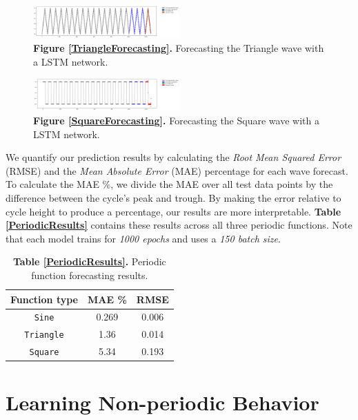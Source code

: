 \documentclass[letterpaper, 10 pt, conference]{ieeeconf}  %
\begin{document}
\label{TriangleForecasting}
\begin{figure}[h]
	\centering
	\includegraphics[width=0.5\textwidth]{assets/triangle_forecast.png}
    \caption{\textbf{Figure \ref{TriangleForecasting}.} Forecasting the Triangle wave with a LSTM network.}
\end{figure}

\label{SquareForecasting}
\begin{figure}[h]
	\centering
	\includegraphics[width=0.5\textwidth]{assets/square_forecast_500epoch.png}
    \caption{\textbf{Figure \ref{SquareForecasting}.} Forecasting the Square wave with a LSTM network.}
\end{figure}

We quantify our prediction results by calculating the \textit{Root Mean Squared Error} (RMSE) and the \textit{Mean Absolute Error} (MAE) percentage for each wave forecast. To calculate the MAE \%, we divide the MAE over all test data points by the difference between the cycle's peak and trough. By making the error relative to cycle height to produce a percentage, our results are more interpretable. \textbf{Table \ref{PeriodicResults}} contains these results across all three periodic functions. Note that each model trains for \textit{1000 epochs} and uses a \textit{150 batch size}.

\label{PeriodicResults}
\begin{table}[h] %
  \centering
  \begin{tabular}{ c | c c }
      Function type & MAE \% & RMSE \\
      \hline
      \verb|Sine| & 0.269  & 0.006 \\
      \verb|Triangle| & 1.36 & 0.014\\
      \verb|Square| & 5.34 & 0.193

  \end{tabular}
  \caption{\textbf{Table \ref{PeriodicResults}.} Periodic function forecasting results.}
\end{table}


\section{Learning Non-periodic Behavior}
\end{document}
